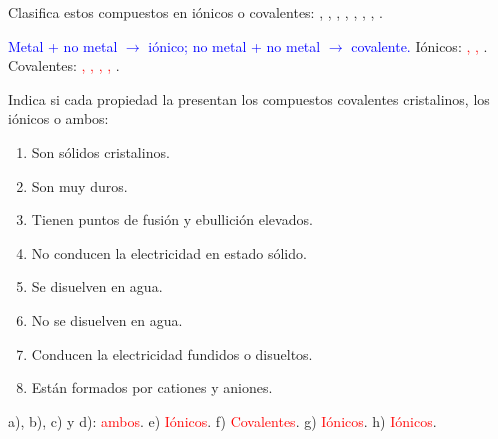 \begin{exercise}
    Clasifica estos compuestos en iónicos o covalentes: , , , , , , , .
    \begin{solu}
        \textcolor{blue}{Metal + no metal \(\to\) iónico; no metal + no metal \(\to\) covalente.} Iónicos: \textcolor{red}{, , }. Covalentes: \textcolor{red}{, , , , }.
    \end{solu}
\end{exercise}

\begin{exercise}
    Indica si cada propiedad la presentan los compuestos covalentes cristalinos, los iónicos o ambos:
    \begin{enumerate}[label=\alph*)]
        \item Son sólidos cristalinos.
        \item Son muy duros.
        \item Tienen puntos de fusión y ebullición elevados.
        \item No conducen la electricidad en estado sólido.
        \item Se disuelven en agua.
        \item No se disuelven en agua.
        \item Conducen la electricidad fundidos o disueltos.
        \item Están formados por cationes y aniones.
    \end{enumerate}
    \begin{solu}
        a), b), c) y d): \textcolor{red}{ambos}. e) \textcolor{red}{Iónicos}. f) \textcolor{red}{Covalentes}. g) \textcolor{red}{Iónicos}. h) \textcolor{red}{Iónicos}.
    \end{solu}
\end{exercise}

